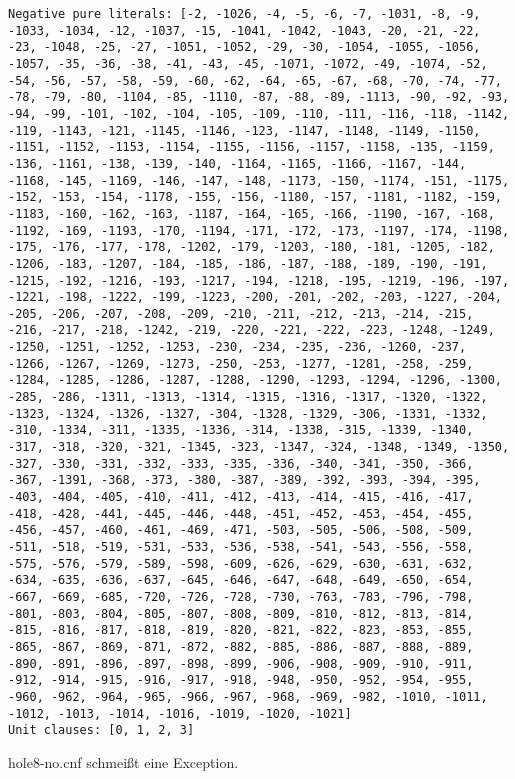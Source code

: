\documentclass[a4paper,10pt]{article}
\begin{document}
\begin{lstlisting}
Negative pure literals: [-2, -1026, -4, -5, -6, -7, -1031, -8, -9, -1033, -1034, -12, -1037, -15, -1041, -1042, -1043, -20, -21, -22, -23, -1048, -25, -27, -1051, -1052, -29, -30, -1054, -1055, -1056, -1057, -35, -36, -38, -41, -43, -45, -1071, -1072, -49, -1074, -52, -54, -56, -57, -58, -59, -60, -62, -64, -65, -67, -68, -70, -74, -77, -78, -79, -80, -1104, -85, -1110, -87, -88, -89, -1113, -90, -92, -93, -94, -99, -101, -102, -104, -105, -109, -110, -111, -116, -118, -1142, -119, -1143, -121, -1145, -1146, -123, -1147, -1148, -1149, -1150, -1151, -1152, -1153, -1154, -1155, -1156, -1157, -1158, -135, -1159, -136, -1161, -138, -139, -140, -1164, -1165, -1166, -1167, -144, -1168, -145, -1169, -146, -147, -148, -1173, -150, -1174, -151, -1175, -152, -153, -154, -1178, -155, -156, -1180, -157, -1181, -1182, -159, -1183, -160, -162, -163, -1187, -164, -165, -166, -1190, -167, -168, -1192, -169, -1193, -170, -1194, -171, -172, -173, -1197, -174, -1198, -175, -176, -177, -178, -1202, -179, -1203, -180, -181, -1205, -182, -1206, -183, -1207, -184, -185, -186, -187, -188, -189, -190, -191, -1215, -192, -1216, -193, -1217, -194, -1218, -195, -1219, -196, -197, -1221, -198, -1222, -199, -1223, -200, -201, -202, -203, -1227, -204, -205, -206, -207, -208, -209, -210, -211, -212, -213, -214, -215, -216, -217, -218, -1242, -219, -220, -221, -222, -223, -1248, -1249, -1250, -1251, -1252, -1253, -230, -234, -235, -236, -1260, -237, -1266, -1267, -1269, -1273, -250, -253, -1277, -1281, -258, -259, -1284, -1285, -1286, -1287, -1288, -1290, -1293, -1294, -1296, -1300, -285, -286, -1311, -1313, -1314, -1315, -1316, -1317, -1320, -1322, -1323, -1324, -1326, -1327, -304, -1328, -1329, -306, -1331, -1332, -310, -1334, -311, -1335, -1336, -314, -1338, -315, -1339, -1340, -317, -318, -320, -321, -1345, -323, -1347, -324, -1348, -1349, -1350, -327, -330, -331, -332, -333, -335, -336, -340, -341, -350, -366, -367, -1391, -368, -373, -380, -387, -389, -392, -393, -394, -395, -403, -404, -405, -410, -411, -412, -413, -414, -415, -416, -417, -418, -428, -441, -445, -446, -448, -451, -452, -453, -454, -455, -456, -457, -460, -461, -469, -471, -503, -505, -506, -508, -509, -511, -518, -519, -531, -533, -536, -538, -541, -543, -556, -558, -575, -576, -579, -589, -598, -609, -626, -629, -630, -631, -632, -634, -635, -636, -637, -645, -646, -647, -648, -649, -650, -654, -667, -669, -685, -720, -726, -728, -730, -763, -783, -796, -798, -801, -803, -804, -805, -807, -808, -809, -810, -812, -813, -814, -815, -816, -817, -818, -819, -820, -821, -822, -823, -853, -855, -865, -867, -869, -871, -872, -882, -885, -886, -887, -888, -889, -890, -891, -896, -897, -898, -899, -906, -908, -909, -910, -911, -912, -914, -915, -916, -917, -918, -948, -950, -952, -954, -955, -960, -962, -964, -965, -966, -967, -968, -969, -982, -1010, -1011, -1012, -1013, -1014, -1016, -1019, -1020, -1021]
Unit clauses: [0, 1, 2, 3]
\end{lstlisting}
hole8-no.cnf schmeißt eine Exception.
\end{document}
